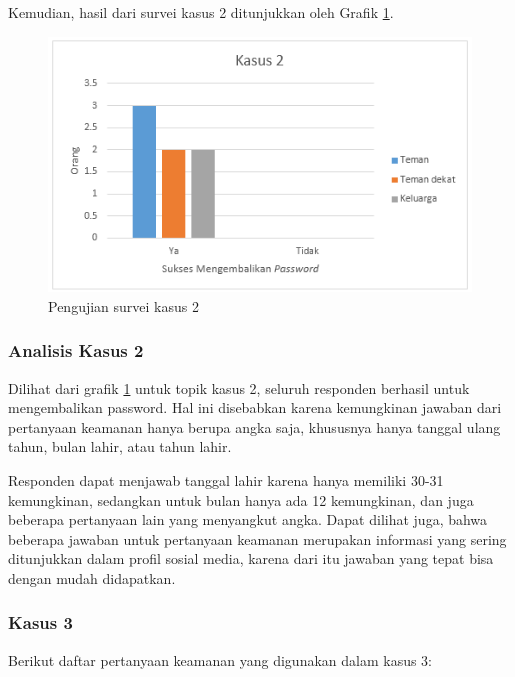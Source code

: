 Kemudian, hasil dari survei kasus 2 ditunjukkan oleh Grafik \ref{fig:kasus2}.

\begin{figure}[H]
	\includegraphics[scale=0.8]{Gambar/kasus2}
	\centering
	\caption{Pengujian survei kasus 2}\label{fig:kasus2}
\end{figure}

\subsubsection{Analisis Kasus 2}

Dilihat dari grafik \ref{fig:kasus2} untuk topik kasus 2, seluruh responden berhasil untuk mengembalikan password. Hal ini disebabkan karena kemungkinan jawaban dari pertanyaan keamanan hanya berupa angka saja, khususnya hanya tanggal ulang tahun, bulan lahir, atau tahun lahir.

Responden dapat menjawab tanggal lahir karena hanya memiliki 30-31 kemungkinan, sedangkan untuk bulan hanya ada 12 kemungkinan, dan juga beberapa pertanyaan lain yang menyangkut angka. Dapat dilihat juga, bahwa beberapa jawaban untuk pertanyaan keamanan merupakan informasi yang sering ditunjukkan dalam profil sosial media, karena dari itu jawaban yang tepat bisa dengan mudah didapatkan.

\subsubsection{Kasus 3}

Berikut daftar pertanyaan keamanan yang digunakan dalam kasus 3:


